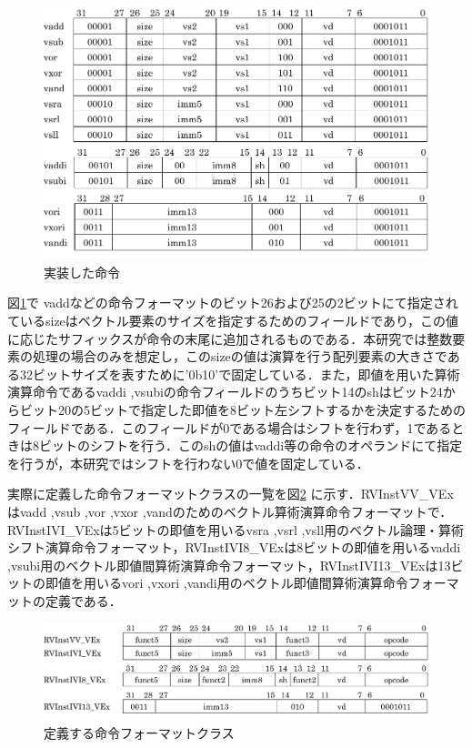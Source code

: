 \begin{figure}[tb]
    \centering
    \includegraphics[scale=0.8]{image/jissou_inst_format.pdf}
    \caption{実装した命令}
    \label{fig:jissou_inst_format}
\end{figure}

図\ref{fig:jissou_inst_format}で
vaddなどの命令フォーマットのビット26および25の2ビットにて指定されているsizeはベクトル要素のサイズを指定するためのフィールドであり，この値に応じたサフィックスが命令の末尾に追加されるものである．本研究では整数要素の処理の場合のみを想定し，このsizeの値は演算を行う配列要素の大きさである32ビットサイズを表すために'0b10'で固定している．また，即値を用いた算術演算命令であるvaddi ,vsubiの命令フィールドのうちビット14のshはビット24からビット20の5ビットで指定した即値を8ビット左シフトするかを決定するためのフィールドである．このフィールドが0である場合はシフトを行わず，1であるときは8ビットのシフトを行う．このshの値はvaddi等の命令のオペランドにて指定を行うが，本研究ではシフトを行わない0で値を固定している．

実際に定義した命令フォーマットクラスの一覧を図\ref{fig:jissou_inst_format_class}
に示す．RVInstVV\_VExはvadd ,vsub ,vor ,vxor ,vandのためのベクトル算術演算命令フォーマットで．RVInstIVI\_VExは5ビットの即値を用いるvsra ,vsrl ,vsll用のベクトル論理・算術シフト演算命令フォーマット，RVInstIVI8\_VExは8ビットの即値を用いるvaddi ,vsubi用のベクトル即値間算術演算命令フォーマット，RVInstIVI13\_VExは13ビットの即値を用いるvori ,vxori ,vandi用のベクトル即値間算術演算命令フォーマットの定義である．

\begin{figure}[tb]
    \centering
    \includegraphics[scale=0.8]{image/jissou_inst_format_class.pdf}
    \caption{定義する命令フォーマットクラス}
    \label{fig:jissou_inst_format_class}
\end{figure}

